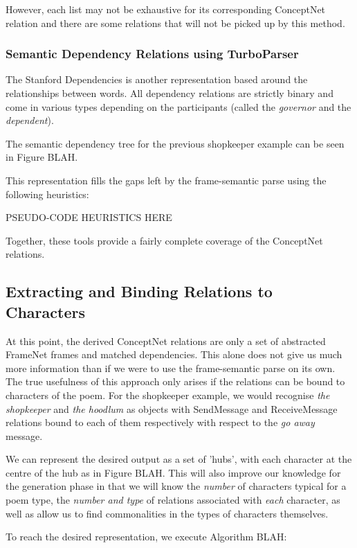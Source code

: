 However, each list may not be exhaustive for its corresponding ConceptNet relation and there are some relations that will not be picked up by this method.


\subsubsection{Semantic Dependency Relations using TurboParser}
\label{sec:turbo}

The Stanford Dependencies is another representation based around the relationships between words. All dependency relations are strictly binary and come in various types depending on the participants (called the \textit{governor} and the \textit{dependent}).

The semantic dependency tree for the previous shopkeeper example can be seen in Figure BLAH.

This representation fills the gaps left by the frame-semantic parse using the following heuristics:

PSEUDO-CODE HEURISTICS HERE

Together, these tools provide a fairly complete coverage of the ConceptNet relations.


\subsection{Extracting and Binding Relations to Characters}

At this point, the derived ConceptNet relations are only a set of abstracted FrameNet frames and matched dependencies. This alone does not give us much more information than if we were to use the frame-semantic parse on its own. The true usefulness of this approach only arises if the relations can be bound to characters of the poem. For the shopkeeper example, we would recognise \textit{the shopkeeper} and \textit{the hoodlum} as objects with SendMessage and ReceiveMessage relations bound to each of them respectively with respect to the \textit{go away} message.

We can represent the desired output as a set of 'hubs', with each character at the centre of the hub as in Figure BLAH. This will also improve our knowledge for the generation phase in that we will know the \textit{number} of characters typical for a poem type, the \textit{number and type} of relations associated with \textit{each} character, as well as allow us to find commonalities in the types of characters themselves.

To reach the desired representation, we execute Algorithm BLAH:

